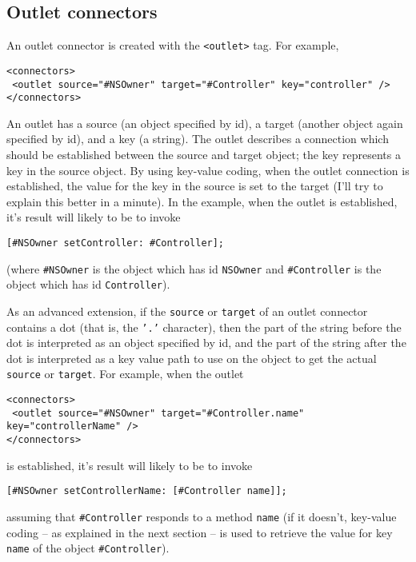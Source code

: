 \subsection{Outlet connectors}
An outlet connector is created with the \texttt{<outlet>} tag.  For
example,
\begin{verbatim}
<connectors>
 <outlet source="#NSOwner" target="#Controller" key="controller" />
</connectors>
\end{verbatim}
An outlet has a source (an object specified by id), a target (another
object again specified by id), and a key (a string).  The outlet
describes a connection which should be established between the source
and target object; the key represents a key in the source object.  By
using key-value coding, when the outlet connection is established, the
value for the key in the source is set to the target (I'll try to
explain this better in a minute).  In the example, when the outlet is
established, it's result will likely to be to invoke
\begin{verbatim}
[#NSOwner setController: #Controller];
\end{verbatim}
(where \texttt{\#NSOwner} is the object which has id \texttt{NSOwner}
and \texttt{\#Controller} is the object which has id
\texttt{Controller}).

As an advanced extension, if the \texttt{source} or \texttt{target} of
an outlet connector contains a dot (that is, the \texttt{'.'} 
character), then the part of the string before the dot is interpreted
as an object specified by id, and the part of the string after the dot
is interpreted as a key value path to use on the object to get the
actual \texttt{source} or \texttt{target}.  For example, when the outlet
\begin{verbatim}
<connectors>
 <outlet source="#NSOwner" target="#Controller.name" key="controllerName" />
</connectors>
\end{verbatim}
is established, it's result will likely to be to invoke
\begin{verbatim}
[#NSOwner setControllerName: [#Controller name]];
\end{verbatim}
assuming that \texttt{\#Controller} responds to a method
\texttt{name} (if it doesn't, key-value coding -- as explained 
in the next section -- is used to retrieve the value for key
\texttt{name} of the object \texttt{\#Controller}).

